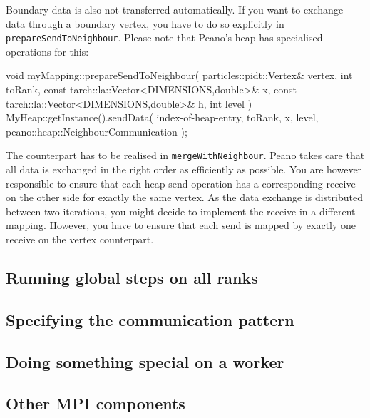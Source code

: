 \noindent
Boundary data is also not transferred automatically. 
If you want to exchange data through a boundary vertex, you have to do so
explicitly in \texttt{prepareSendToNeighbour}.
Please note that Peano's heap has specialised operations for this:
\begin{code}
void myMapping::prepareSendToNeighbour(
  particles::pidt::Vertex&                      vertex,
  int                                           toRank,
  const tarch::la::Vector<DIMENSIONS,double>&   x,
  const tarch::la::Vector<DIMENSIONS,double>&   h,
  int                                           level
) {
  MyHeap::getInstance().sendData(
    index-of-heap-entry,
    toRank,
    x,
    level,
    peano::heap::NeighbourCommunication
  );
}
\end{code}

\noindent
The counterpart has to be realised in \texttt{mergeWithNeighbour}.
Peano takes care that all data is exchanged in the right order as efficiently as
possible.
You are however responsible to ensure that each heap send operation has a
corresponding receive on the other side for exactly the same vertex.
As the data exchange is distributed between two iterations, you might decide to
implement the receive in a different mapping.
However, you have to ensure that each send is mapped by exactly one receive on
the vertex counterpart.

\subsection{Running global steps on all ranks}

\subsection{Specifying the communication pattern}

\subsection{Doing something special on a worker}



\subsection{Other MPI components}

